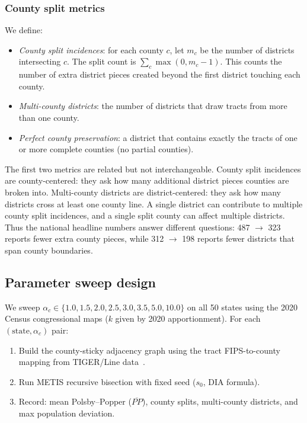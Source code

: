 \subsubsection{County split metrics}

We define:
\begin{itemize}
  \item \emph{County split incidences}: for each county $c$, let
    $m_c$ be the number of districts intersecting $c$.
    The split count is $\sum_c \max(0, m_c - 1)$.
    This counts the number of extra district pieces created beyond the
    first district touching each county.
  \item \emph{Multi-county districts}: the number of districts that
    draw tracts from more than one county.
  \item \emph{Perfect county preservation}: a district that contains
    exactly the tracts of one or more complete counties (no partial
    counties).
\end{itemize}

The first two metrics are related but not interchangeable.
County split incidences are county-centered: they ask how many additional
district pieces counties are broken into.
Multi-county districts are district-centered: they ask how many districts cross
at least one county line.
A single district can contribute to multiple county split incidences, and a
single split county can affect multiple districts.
Thus the national headline numbers answer different questions: 487 $\to$ 323
reports fewer extra county pieces, while 312 $\to$ 198 reports fewer districts
that span county boundaries.

\subsection{Parameter sweep design}

We sweep $\alpha_c \in \{1.0, 1.5, 2.0, 2.5, 3.0, 3.5, 5.0, 10.0\}$ on all 50
states using the 2020 Census congressional maps ($k$ given by 2020
apportionment).  For each $(\text{state}, \alpha_c)$ pair:
\begin{enumerate}
  \item Build the county-sticky adjacency graph using the tract FIPS-to-county
    mapping from TIGER/Line data~\citep{tiger-census}.
  \item Run METIS recursive bisection with fixed seed ($s_0$, DIA formula).
  \item Record: mean Polsby--Popper ($\overline{PP}$), county splits,
    multi-county districts, and max population deviation.
\end{enumerate}

